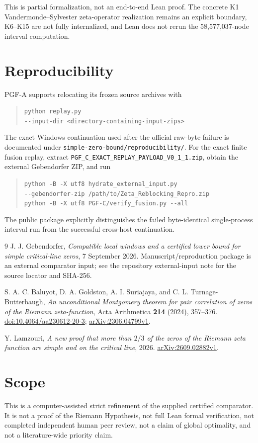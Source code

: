 \documentclass[11pt]{article}
\begin{document}
This is partial formalization, not an end-to-end Lean proof. The concrete K1
Vandermonde--Sylvester zeta-operator realization remains an explicit boundary, K6--K15 are not
fully internalized, and Lean does not rerun the 58,577,037-node interval computation.

\section{Reproducibility}
PGF-A supports relocating its frozen source archives with
\begin{quote}
\texttt{python replay.py}\\
\texttt{\quad -{}-input-dir <directory-containing-input-zips>}
\end{quote}
The exact Windows continuation used after the official raw-byte failure is documented under
\nolinkurl{simple-zero-bound/reproducibility/}. For the exact finite fusion replay, extract
\nolinkurl{PGF_C_EXACT_REPLAY_PAYLOAD_V0_1_1.zip}, obtain the external Gebendorfer ZIP, and run
\begin{quote}
\texttt{python -B -X utf8 hydrate\_external\_input.py}\\
\texttt{\quad -{}-gebendorfer-zip /path/to/Zeta\_Reblocking\_Repro.zip}\\
\texttt{python -B -X utf8 PGF-C/verify\_fusion.py -{}-all}
\end{quote}
The public package explicitly distinguishes
the failed byte-identical single-process interval run from the successful cross-host continuation.

\begin{thebibliography}{9}
J. J. Gebendorfer,
\emph{Compatible local windows and a certified lower bound for simple critical-line zeros},
7 September 2026. Manuscript/reproduction package is an external comparator input; see the repository external-input note for the source locator and SHA-256.

S. A. C. Baluyot, D. A. Goldston, A. I. Suriajaya, and C. L. Turnage-Butterbaugh,
\emph{An unconditional Montgomery theorem for pair correlation of zeros of the Riemann zeta-function},
Acta Arithmetica \textbf{214} (2024), 357--376.
\href{https://doi.org/10.4064/aa230612-20-3}{doi:10.4064/aa230612-20-3};
\href{https://arxiv.org/abs/2306.04799v1}{arXiv:2306.04799v1}.

Y. Lamzouri,
\emph{A new proof that more than $2/3$ of the zeros of the Riemann zeta function are simple and on the critical line},
2026.
\href{https://arxiv.org/abs/2609.02882v1}{arXiv:2609.02882v1}.
\end{thebibliography}

\section{Scope}
This is a computer-assisted strict refinement of the supplied certified comparator.
It is not a proof of the Riemann Hypothesis, not full Lean formal verification,
not completed independent human peer review, not a claim of global optimality,
and not a literature-wide priority claim.
\end{document}

